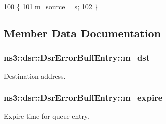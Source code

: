 \begin{DoxyCode}
100   \{
101     \hyperlink{classns3_1_1dsr_1_1DsrErrorBuffEntry_aa27198f2b94226c5a1a5fa30da020e9b}{m\_source} = \hyperlink{generate__test__data__lte__sinr_8m_ad83eeb3a142285d1243a08c6b7026df8}{s};
102   \}
\end{DoxyCode}


\subsection{Member Data Documentation}
\subsubsection[{\texorpdfstring{m\+\_\+dst}{m_dst}}]{ ns3\+::dsr\+::\+Dsr\+Error\+Buff\+Entry\+::m\+\_\+dst\hspace{0.3cm}{\ttfamily [private]}}\hypertarget{classns3_1_1dsr_1_1DsrErrorBuffEntry_aa8ae0568bc601a36c89b65de468d238b}{}\label{classns3_1_1dsr_1_1DsrErrorBuffEntry_aa8ae0568bc601a36c89b65de468d238b}


Destination address. 

\subsubsection[{\texorpdfstring{m\+\_\+expire}{m_expire}}]{ ns3\+::dsr\+::\+Dsr\+Error\+Buff\+Entry\+::m\+\_\+expire\hspace{0.3cm}{\ttfamily [private]}}\hypertarget{classns3_1_1dsr_1_1DsrErrorBuffEntry_ad6526447139c2f10fff72be96f34db39}{}\label{classns3_1_1dsr_1_1DsrErrorBuffEntry_ad6526447139c2f10fff72be96f34db39}


Expire time for queue entry. 

